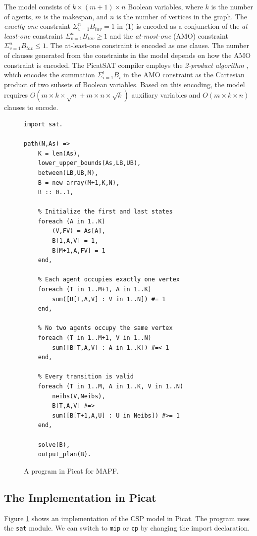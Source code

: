 \documentclass[conference]{IEEEtran}
\begin{document}
The model consists of $k\times(m+1)\times n$ Boolean variables, where $k$ is the number of agents, $m$ is the makespan, and $n$ is the number of vertices in the graph. The \textit{exactly-one} constraint $\Sigma_{v=1}^{n} B_{t a v} = 1$ in (1) is encoded as a conjunction of the \textit{at-least-one} constraint $\Sigma_{v=1}^{n} B_{t a v} \ge 1$ and the \textit{at-most-one} (AMO) constraint $\Sigma_{v=1}^{n} B_{t a v} \le 1$. The at-least-one constraint is encoded as one clause. The number of clauses generated from the constraints in the model depends on how the AMO constraint is encoded. The PicatSAT compiler employs the \textit{2-product algorithm} \cite{JChen10}, which encodes the summation $\Sigma_{i=1}^{l} B_i$ in the AMO constraint as the Cartesian product of two subsets of Boolean variables. Based on this encoding, the model requires $O(m\times k\times \sqrt{n}+ m\times n \times \sqrt{k})$ auxiliary variables and $O(m\times k \times n)$ clauses to encode.


\begin{figure}[!t]
\begin{small}
\begin{verbatim}
import sat.

path(N,As) =>
    K = len(As),
    lower_upper_bounds(As,LB,UB),
    between(LB,UB,M),
    B = new_array(M+1,K,N),
    B :: 0..1,

    % Initialize the first and last states
    foreach (A in 1..K)    
        (V,FV) = As[A],
        B[1,A,V] = 1,
        B[M+1,A,FV] = 1
    end,

    % Each agent occupies exactly one vertex 
    foreach (T in 1..M+1, A in 1..K)
        sum([B[T,A,V] : V in 1..N]) #= 1
    end,

    % No two agents occupy the same vertex 
    foreach (T in 1..M+1, V in 1..N) 
        sum([B[T,A,V] : A in 1..K]) #=< 1   
    end,

    % Every transition is valid
    foreach (T in 1..M, A in 1..K, V in 1..N) 
        neibs(V,Neibs),
        B[T,A,V] #=> 
        sum([B[T+1,A,U] : U in Neibs]) #>= 1
    end,

    solve(B),
    output_plan(B).
\end{verbatim}
\end{small}
\caption{A program in Picat for MAPF.}
\label{fig:mapf_sat}
\end{figure}

\subsection{The Implementation in Picat}
Figure \ref{fig:mapf_sat} shows an implementation of the CSP  model in Picat. The program uses the \texttt{sat} module. We can switch to \texttt{mip} or \texttt{cp} by changing the import declaration.
\end{document}
